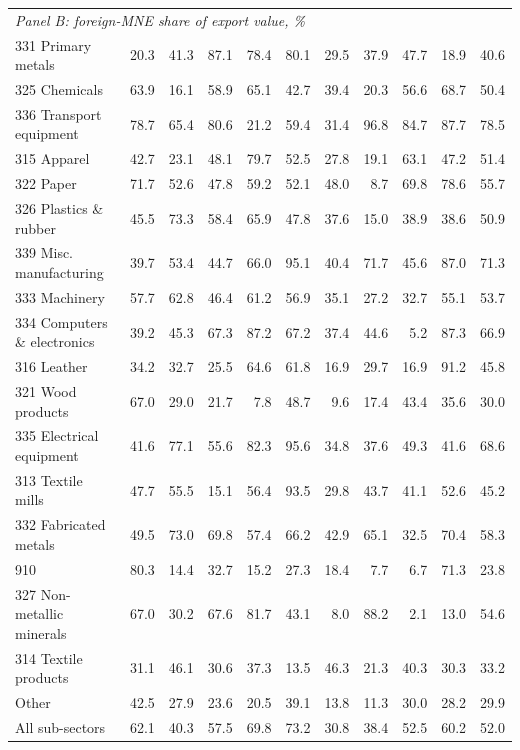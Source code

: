 \begin{tabular}{lrrrrrrrrrr}
\midrule
\multicolumn{11}{l}{\textit{Panel B: foreign-MNE share of export value, \%}} \\
331 Primary metals & 20.3 & 41.3 & 87.1 & 78.4 & 80.1 & 29.5 & 37.9 & 47.7 & 18.9 & 40.6 \\
325 Chemicals & 63.9 & 16.1 & 58.9 & 65.1 & 42.7 & 39.4 & 20.3 & 56.6 & 68.7 & 50.4 \\
336 Transport equipment & 78.7 & 65.4 & 80.6 & 21.2 & 59.4 & 31.4 & 96.8 & 84.7 & 87.7 & 78.5 \\
315 Apparel & 42.7 & 23.1 & 48.1 & 79.7 & 52.5 & 27.8 & 19.1 & 63.1 & 47.2 & 51.4 \\
322 Paper & 71.7 & 52.6 & 47.8 & 59.2 & 52.1 & 48.0 & 8.7 & 69.8 & 78.6 & 55.7 \\
326 Plastics \& rubber & 45.5 & 73.3 & 58.4 & 65.9 & 47.8 & 37.6 & 15.0 & 38.9 & 38.6 & 50.9 \\
339 Misc. manufacturing & 39.7 & 53.4 & 44.7 & 66.0 & 95.1 & 40.4 & 71.7 & 45.6 & 87.0 & 71.3 \\
333 Machinery & 57.7 & 62.8 & 46.4 & 61.2 & 56.9 & 35.1 & 27.2 & 32.7 & 55.1 & 53.7 \\
334 Computers \& electronics & 39.2 & 45.3 & 67.3 & 87.2 & 67.2 & 37.4 & 44.6 & 5.2 & 87.3 & 66.9 \\
316 Leather & 34.2 & 32.7 & 25.5 & 64.6 & 61.8 & 16.9 & 29.7 & 16.9 & 91.2 & 45.8 \\
321 Wood products & 67.0 & 29.0 & 21.7 & 7.8 & 48.7 & 9.6 & 17.4 & 43.4 & 35.6 & 30.0 \\
335 Electrical equipment & 41.6 & 77.1 & 55.6 & 82.3 & 95.6 & 34.8 & 37.6 & 49.3 & 41.6 & 68.6 \\
313 Textile mills & 47.7 & 55.5 & 15.1 & 56.4 & 93.5 & 29.8 & 43.7 & 41.1 & 52.6 & 45.2 \\
332 Fabricated metals & 49.5 & 73.0 & 69.8 & 57.4 & 66.2 & 42.9 & 65.1 & 32.5 & 70.4 & 58.3 \\
910 & 80.3 & 14.4 & 32.7 & 15.2 & 27.3 & 18.4 & 7.7 & 6.7 & 71.3 & 23.8 \\
327 Non-metallic minerals & 67.0 & 30.2 & 67.6 & 81.7 & 43.1 & 8.0 & 88.2 & 2.1 & 13.0 & 54.6 \\
314 Textile products & 31.1 & 46.1 & 30.6 & 37.3 & 13.5 & 46.3 & 21.3 & 40.3 & 30.3 & 33.2 \\
Other & 42.5 & 27.9 & 23.6 & 20.5 & 39.1 & 13.8 & 11.3 & 30.0 & 28.2 & 29.9 \\
All sub-sectors & 62.1 & 40.3 & 57.5 & 69.8 & 73.2 & 30.8 & 38.4 & 52.5 & 60.2 & 52.0 \\
\bottomrule
\end{tabular}
